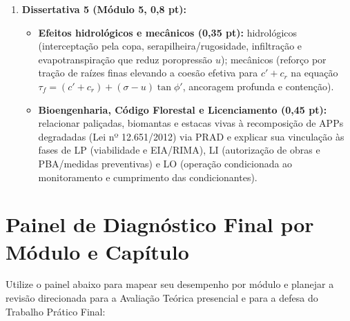 \begin{boxConceito}
\begin{enumerate}[leftmargin=1.6em, itemsep=5pt]
  \item \textbf{Dissertativa 5 (Módulo 5, 0,8 pt):}
  \begin{itemize}[leftmargin=1.4em, itemsep=1pt, topsep=2pt]
    \item \textbf{Efeitos hidrológicos e mecânicos (0,35 pt):} hidrológicos (interceptação pela copa, serapilheira/rugosidade, infiltração e evapotranspiração que reduz poropressão $u$); mecânicos (reforço por tração de raízes finas elevando a coesão efetiva para $c' + c_r$ na equação $\tau_f = (c' + c_r) + (\sigma - u)\tan\phi'$, ancoragem profunda e contenção).
    \item \textbf{Bioengenharia, Código Florestal e Licenciamento (0,45 pt):} relacionar paliçadas, biomantas e estacas vivas à recomposição de APPs degradadas (Lei nº 12.651/2012) via PRAD e explicar sua vinculação às fases de LP (viabilidade e EIA/RIMA), LI (autorização de obras e PBA/medidas preventivas) e LO (operação condicionada ao monitoramento e cumprimento das condicionantes).
  \end{itemize}
\end{enumerate}
\end{boxConceito}

\section*{Painel de Diagnóstico Final por Módulo e Capítulo}

\noindent Utilize o painel abaixo para mapear seu desempenho por módulo e planejar a revisão direcionada para a Avaliação Teórica presencial e para a defesa do Trabalho Prático Final:

